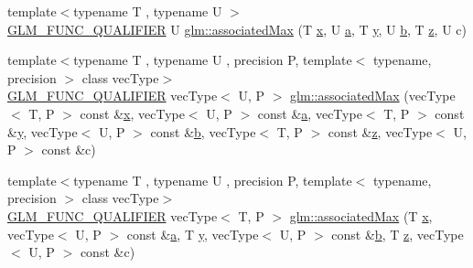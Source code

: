 \begin{DoxyCompactItemize}
\item 
{\footnotesize template$<$typename T , typename U $>$ }\\\mbox{\hyperlink{setup_8hpp_a33fdea6f91c5f834105f7415e2a64407}{G\+L\+M\+\_\+\+F\+U\+N\+C\+\_\+\+Q\+U\+A\+L\+I\+F\+I\+ER}} U \mbox{\hyperlink{group__gtx__associated__min__max_gaec891e363d91abbf3a4443cf2f652209}{glm\+::associated\+Max}} (T \mbox{\hyperlink{glad_8h_a92d0386e5c19fb81ea88c9f99644ab1d}{x}}, U \mbox{\hyperlink{glad_8h_ac8729153468b5dcf13f971b21d84d4e5}{a}}, T \mbox{\hyperlink{glad_8h_a66ddd433d2cacfe27f5906b7e86faeed}{y}}, U \mbox{\hyperlink{glad_8h_a6eba317e3cf44d6d26c04a5a8f197dcb}{b}}, T \mbox{\hyperlink{glad_8h_acb78bf1972d3eaf07da34ff2e0a2f133}{z}}, U c)
\item 
{\footnotesize template$<$typename T , typename U , precision P, template$<$ typename, precision $>$ class vec\+Type$>$ }\\\mbox{\hyperlink{setup_8hpp_a33fdea6f91c5f834105f7415e2a64407}{G\+L\+M\+\_\+\+F\+U\+N\+C\+\_\+\+Q\+U\+A\+L\+I\+F\+I\+ER}} vec\+Type$<$ U, P $>$ \mbox{\hyperlink{group__gtx__associated__min__max_ga065a0c1eb7837118ef79be88dfd78487}{glm\+::associated\+Max}} (vec\+Type$<$ T, P $>$ const \&\mbox{\hyperlink{glad_8h_a92d0386e5c19fb81ea88c9f99644ab1d}{x}}, vec\+Type$<$ U, P $>$ const \&\mbox{\hyperlink{glad_8h_ac8729153468b5dcf13f971b21d84d4e5}{a}}, vec\+Type$<$ T, P $>$ const \&\mbox{\hyperlink{glad_8h_a66ddd433d2cacfe27f5906b7e86faeed}{y}}, vec\+Type$<$ U, P $>$ const \&\mbox{\hyperlink{glad_8h_a6eba317e3cf44d6d26c04a5a8f197dcb}{b}}, vec\+Type$<$ T, P $>$ const \&\mbox{\hyperlink{glad_8h_acb78bf1972d3eaf07da34ff2e0a2f133}{z}}, vec\+Type$<$ U, P $>$ const \&c)
\item 
{\footnotesize template$<$typename T , typename U , precision P, template$<$ typename, precision $>$ class vec\+Type$>$ }\\\mbox{\hyperlink{setup_8hpp_a33fdea6f91c5f834105f7415e2a64407}{G\+L\+M\+\_\+\+F\+U\+N\+C\+\_\+\+Q\+U\+A\+L\+I\+F\+I\+ER}} vec\+Type$<$ T, P $>$ \mbox{\hyperlink{group__gtx__associated__min__max_ga553431a468e251623408603bcb51c9cb}{glm\+::associated\+Max}} (T \mbox{\hyperlink{glad_8h_a92d0386e5c19fb81ea88c9f99644ab1d}{x}}, vec\+Type$<$ U, P $>$ const \&\mbox{\hyperlink{glad_8h_ac8729153468b5dcf13f971b21d84d4e5}{a}}, T \mbox{\hyperlink{glad_8h_a66ddd433d2cacfe27f5906b7e86faeed}{y}}, vec\+Type$<$ U, P $>$ const \&\mbox{\hyperlink{glad_8h_a6eba317e3cf44d6d26c04a5a8f197dcb}{b}}, T \mbox{\hyperlink{glad_8h_acb78bf1972d3eaf07da34ff2e0a2f133}{z}}, vec\+Type$<$ U, P $>$ const \&c)
\item 

\end{DoxyCompactItemize}
